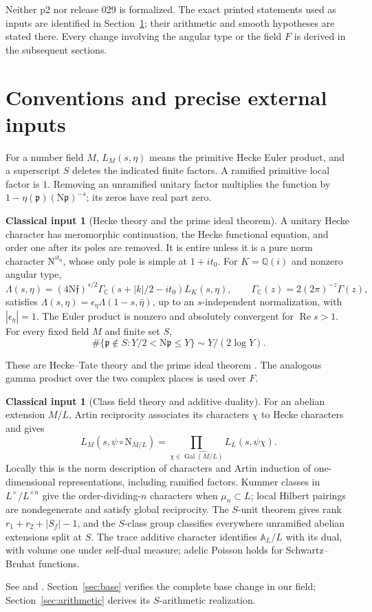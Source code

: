 \documentclass[11pt,a4paper]{article}
\numberwithin{equation}{section}
\theoremstyle{definition}
\newtheorem{inputthm}[theorem]{Classical input}
\theoremstyle{remark}
\newcommand{\Q}{\mathbb Q}
\newcommand{\C}{\mathbb C}
\newcommand{\A}{\mathbb A}
\newcommand{\N}{\mathrm N}
\newcommand{\Rea}{\operatorname{Re}}
\newcommand{\GC}{\Gamma_{\C}}
\begin{document}
Neither p2 nor release 029 is formalized. The exact printed statements used as inputs are identified in Section~\ref{sec:inputs}; their arithmetic and smooth hypotheses are stated there. Every change involving the angular type or the field $F$ is derived in the subsequent sections.

\section{Conventions and precise external inputs}\label{sec:inputs}
For a number field $M$, $L_M(s,\eta)$ means the primitive Hecke Euler product, and a superscript $S$ deletes the indicated finite factors. A ramified primitive local factor is $1$. Removing an unramified unitary factor multiplies the function by $1-\eta(\mathfrak p)(\N\mathfrak p)^{-s}$; its zeros have real part zero.

\begin{inputthm}[Hecke theory and the prime ideal theorem]\label{inp:Hecke}
A unitary Hecke character has meromorphic continuation, the Hecke functional equation, and order one after its poles are removed. It is entire unless it is a pure norm character $\N^{it_0}$, whose only pole is simple at $1+it_0$. For $K=\Q(i)$ and nonzero angular type,
\[
 \Lambda(s,\eta)=(4\N\mathfrak f)^{s/2}
 \GC(s+|k|/2-it_0)L_K(s,\eta),\qquad
 \GC(z)=2(2\pi)^{-z}\Gamma(z),
\]
satisfies $\Lambda(s,\eta)=\epsilon_\eta\Lambda(1-s,\bar\eta)$, up to an $s$-independent normalization, with $|\epsilon_\eta|=1$. The Euler product is nonzero and absolutely convergent for $\Rea s>1$. For every fixed field $M$ and finite set $S$,
\[
 \#\{\mathfrak p\notin S:Y/2<\N\mathfrak p\le Y\}
 \sim Y/(2\log Y).
\]
\end{inputthm}
These are Hecke--Tate theory \cite{Hecke,Tate,Watkins} and the prime ideal theorem \cite[Chapter 5]{IK}. The analogous gamma product over the two complex places is used over $F$.

\begin{inputthm}[Class field theory and additive duality]\label{inp:CFT}
For an abelian extension $M/L$, Artin reciprocity associates its characters $\chi$ to Hecke characters and gives
\[
 L_M(s,\psi\circ\N_{M/L})=\prod_{\chi\in\widehat{\operatorname{Gal}(M/L)}}L_L(s,\psi\chi).
\]
Locally this is the norm description of characters and Artin induction of one-dimensional representations, including ramified factors. Kummer classes in $L^\times/L^{\times n}$ give the order-dividing-$n$ characters when $\mu_n\subset L$; local Hilbert pairings are nondegenerate and satisfy global reciprocity. The $S$-unit theorem gives rank $r_1+r_2+|S_f|-1$, and the $S$-class group classifies everywhere unramified abelian extensions split at $S$. The trace additive character identifies $\A_L/L$ with its dual, with volume one under self-dual measure; adelic Poisson holds for Schwartz--Bruhat functions.
\end{inputthm}
See \cite[Chapters I, IV--VI]{Neukirch} and \cite[Chapter II, Sections 29--30; Chapter III, Section 41]{Weil}. Section~\ref{sec:base} verifies the complete base change in our field; Section~\ref{sec:arithmetic} derives its $S$-arithmetic realization.
\end{document}
